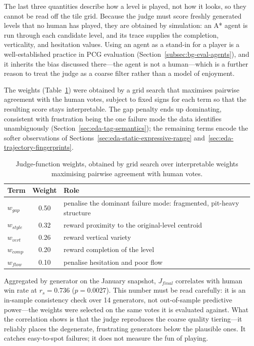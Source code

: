 \documentclass[shortabstract, mgr, english]{iithesis}
\begin{document}
The last three quantities describe how a level is played, not how it
looks, so they cannot be read off the tile grid. Because the judge must score
freshly generated levels that no human has played, they are obtained by
simulation: an A* agent is run through each candidate level, and its trace
supplies the completion, verticality, and hesitation values. Using an agent as
a stand-in for a player is a well-established practice in PCG evaluation
(Section~\ref{subsec:bg-eval-agents}), and it inherits the bias discussed
there---the agent is not a human---which is a further reason to treat the
judge as a coarse filter rather than a model of enjoyment.

The weights (Table~\ref{tab:dpo-judge-weights}) were obtained by a
grid search that maximises pairwise agreement with the human votes, subject to
fixed signs for each term so that the resulting score stays interpretable. The
gap penalty ends up dominating, consistent with frustration being the one
failure mode the data identifies unambiguously
(Section~\ref{sec:eda-tag-semantics}); the remaining terms
encode the softer observations of
Sections~\ref{sec:eda-static-expressive-range}
and~\ref{sec:eda-trajectory-fingerprints}.

\begin{table}[H]
\centering
\begin{tabular}{@{} l c p{7.2cm} @{}}
\toprule
\textbf{Term} & \textbf{Weight} & \textbf{Role} \\
\midrule
$w_{gap}$   & 0.50 & penalise the dominant failure mode: fragmented, pit-heavy structure \\
$w_{style}$ & 0.32 & reward proximity to the original-level centroid \\
$w_{vert}$  & 0.26 & reward vertical variety \\
$w_{comp}$  & 0.20 & reward completion of the level \\
$w_{flow}$  & 0.10 & penalise hesitation and poor flow \\
\bottomrule
\end{tabular}
\caption{Judge-function weights, obtained by grid search over
interpretable weights maximising pairwise agreement with human votes.}
\label{tab:dpo-judge-weights}
\end{table}

Aggregated by generator on the January snapshot, $J_{final}$
correlates with human win rate at $r_s = 0.736$ ($p = 0.0027$). This number
must be read carefully: it is an in-sample consistency check over 14
generators, not out-of-sample predictive power---the weights were selected on
the same votes it is evaluated against. What the correlation shows is that
the judge reproduces the coarse quality tiering---it reliably places the
degenerate, frustrating generators below the plausible ones. It catches
easy-to-spot failures; it does not measure the fun of playing.
\end{document}
